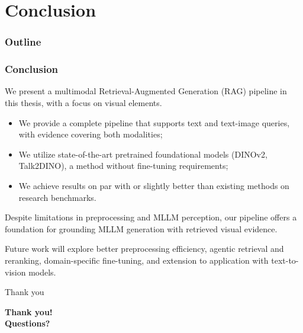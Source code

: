 \documentclass[aspectratio=1610]{beamer}
\begin{document}
    \section{Conclusion}
    \begin{frame}
        \frametitle{Outline}
        \tableofcontents[currentsection, subsectionstyle=show/shaded] 
    \end{frame}

    \begin{frame}
        \frametitle{Conclusion}
        We present a multimodal Retrieval-Augmented Generation (RAG) pipeline in this thesis, with a focus on visual elements.
        \begin{itemize}
            \item We provide a complete pipeline that supports text and text-image queries, with evidence covering both modalities;
            \item We utilize state-of-the-art pretrained foundational models (DINOv2, Talk2DINO), a method without fine-tuning requirements;
            \item We achieve results on par with or slightly better than existing methods on research benchmarks.
        \end{itemize}

        Despite limitations in preprocessing and MLLM perception, our pipeline offers a foundation for grounding MLLM generation with retrieved visual evidence.

        Future work will explore better preprocessing efficiency, agentic retrieval and reranking, domain-specific fine-tuning, and extension to application with text-to-vision models.
    \end{frame}

    \begin{frame}{Thank you}
        \begin{center}
            \Huge \textbf{Thank you!} \\[1cm]
            \Large \textbf{Questions?} \\[1.5cm]
        \end{center}
    \end{frame}
\end{document}
